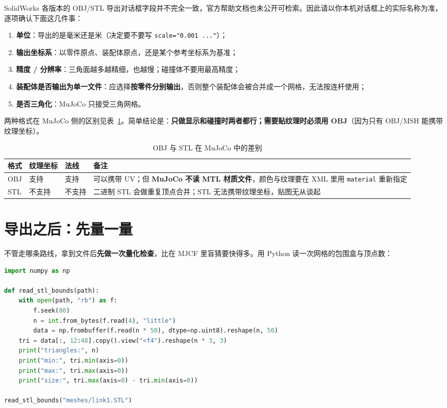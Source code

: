\begin{warnbox}[对话框字段随后续版本变化]
	SolidWorks 各版本的 OBJ/STL 导出对话框字段并不完全一致，官方帮助文档也未公开可检索。因此请以你本机对话框上的实际名称为准，逐项确认下面这几件事：
	\begin{enumerate}
		\item \textbf{单位}：导出的是毫米还是米（决定要不要写 \texttt{scale="0.001 ..."}）；
		\item \textbf{输出坐标系}：以零件原点、装配体原点，还是某个参考坐标系为基准；
		\item \textbf{精度 / 分辨率}：三角面越多越精细，也越慢；碰撞体不要用最高精度；
		\item \textbf{装配体是否输出为单一文件}：应选择\textbf{按零件分别输出}，否则整个装配体会被合并成一个网格，无法按连杆使用；
		\item \textbf{是否三角化}：MuJoCo 只接受三角网格。
	\end{enumerate}
\end{warnbox}

两种格式在 MuJoCo 侧的区别见表~\ref{tab:Cad:格式}。简单结论是：\textbf{只做显示和碰撞时两者都行；需要贴纹理时必须用 OBJ}（因为只有 OBJ/MSH 能携带纹理坐标）。

\begin{table}[H]
	\centering
	\caption{OBJ 与 STL 在 MuJoCo 中的差别}
	\label{tab:Cad:格式}
	\footnotesize
	\begin{tabular}{>{\raggedright\arraybackslash}p{1.8cm}>{\raggedright\arraybackslash}p{3.6cm}>{\raggedright\arraybackslash}p{3.6cm}>{\raggedright\arraybackslash}p{5.0cm}}
		\hline
		格式 & 纹理坐标 & 法线 & 备注 \\
		\hline
		OBJ & 支持 & 支持 & 可以携带 UV；但 \textbf{MuJoCo 不读 MTL 材质文件}，颜色与纹理要在 XML 里用 \texttt{material} 重新指定 \\
		STL & 不支持 & 不支持 & 二进制 STL 会做重复顶点合并；STL 无法携带纹理坐标，贴图无从谈起 \\
		\hline
	\end{tabular}
\end{table}

\section{导出之后：先量一量}

不管走哪条路线，拿到文件后\textbf{先做一次量化检查}，比在 MJCF 里盲猜要快得多。用 Python 读一次网格的包围盒与顶点数：

\begin{lstlisting}[style=code, language=Python]
import numpy as np

def read_stl_bounds(path):
    with open(path, "rb") as f:
        f.seek(80)
        n = int.from_bytes(f.read(4), "little")
        data = np.frombuffer(f.read(n * 50), dtype=np.uint8).reshape(n, 50)
    tri = data[:, 12:48].copy().view("<f4").reshape(n * 3, 3)
    print("triangles:", n)
    print("min:", tri.min(axis=0))
    print("max:", tri.max(axis=0))
    print("size:", tri.max(axis=0) - tri.min(axis=0))

read_stl_bounds("meshes/link1.STL")
\end{lstlisting}

